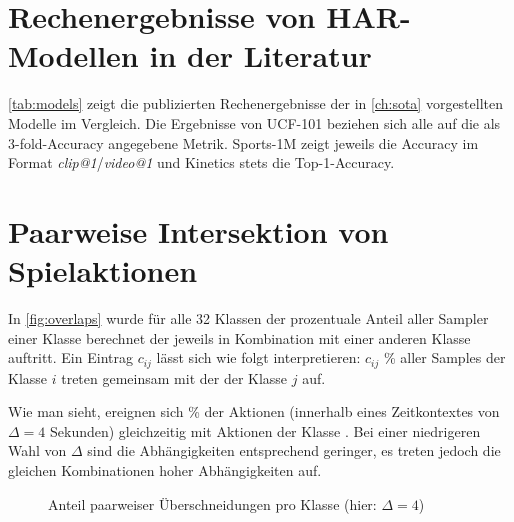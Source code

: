 \chapter{Rechenergebnisse von HAR-Modellen in der Literatur}
\label{ch:leaderboard}

\autoref{tab:models} zeigt die publizierten Rechenergebnisse der in \autoref{ch:sota} vorgestellten Modelle im Vergleich.
Die Ergebnisse von UCF-101 beziehen sich alle auf die als 3-fold-Accuracy angegebene Metrik.
Sports-1M zeigt jeweils die Accuracy im Format \emph{clip@1}/\emph{video@1} und Kinetics stets die Top-1-Accuracy.

\begin{figure}
    \label{tab:models}
\end{figure}

\chapter{Paarweise Intersektion von Spielaktionen}
\label{ch:overlaps}

In \autoref{fig:overlaps} wurde für alle 32 Klassen der prozentuale Anteil aller Sampler einer Klasse berechnet der jeweils in Kombination mit einer anderen Klasse auftritt.
Ein Eintrag $c_{ij}$ lässt sich wie folgt interpretieren:
$c_{ij}$ \% aller Samples der Klasse $i$ treten gemeinsam mit der der Klasse $j$ auf.

Wie man sieht, ereignen sich  \% der Aktionen  (innerhalb eines Zeitkontextes von $\Delta=4$ Sekunden) gleichzeitig mit Aktionen der Klasse .
Bei einer niedrigeren Wahl von $\Delta$ sind die Abhängigkeiten entsprechend geringer, es treten jedoch die gleichen Kombinationen hoher Abhängigkeiten auf.

\begin{figure}
    \centering
    \caption{Anteil paarweiser Überschneidungen pro Klasse (hier: $\Delta = 4$)}
    \label{fig:overlaps}
\end{figure}
